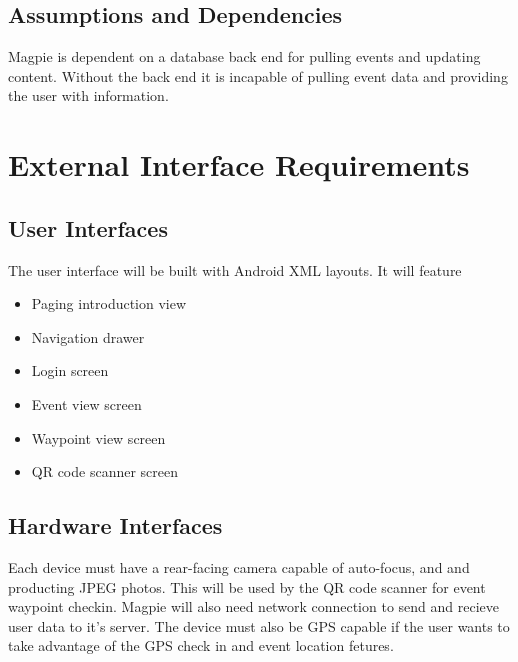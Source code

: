 \documentclass{scrreprt}
\begin{document}
\section{Assumptions and Dependencies}
Magpie is dependent on a database back end for pulling events and updating
content. Without the back end it is incapable of pulling event data and
providing the user with information.


\chapter{External Interface Requirements}

\section{User Interfaces}

The user interface will be built with Android XML layouts. It will feature
\begin{itemize}
\item Paging introduction view
\item Navigation drawer
\item Login screen
\item Event view screen
\item Waypoint view screen
\item QR code scanner screen
\end{itemize}

\section{Hardware Interfaces}
Each device must have a rear-facing camera capable of auto-focus,
and and producting JPEG photos. This will be used by the QR code scanner for event waypoint checkin.
Magpie will also need network connection to send and recieve user data to it's server.
The device must also be GPS capable if the user wants to take advantage of the GPS check in and event location fetures.
\end{document}
